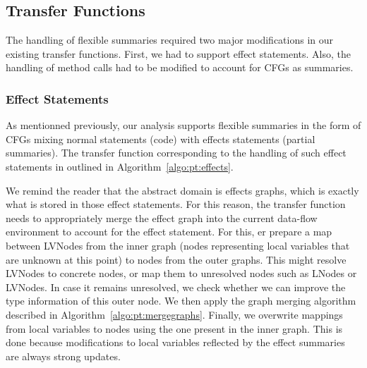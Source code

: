 \documentclass[a4paper]{article}
\begin{document}
\subsection{Transfer Functions}
The handling of flexible summaries required two major modifications in our
existing transfer functions. First, we had to support effect statements.
Also, the handling of method calls had to be modified to account for CFGs as
summaries.

\subsubsection{Effect Statements}
As mentionned previously, our analysis supports flexible summaries in the form
of CFGs mixing normal statements (code) with effects statements (partial
summaries). The transfer function corresponding to the handling of such effect
statements in outlined in Algorithm~\ref{algo:pt:effects}.

We remind the reader that the abstract domain is effects graphs, which is
exactly what is stored in those effect statements. For this reason, the
transfer function needs to appropriately merge the effect graph into the
current data-flow environment to account for the effect statement. For this,
er prepare a map between LVNodes from the inner graph (nodes representing local
variables that are unknown at this point) to nodes from the outer graphs. This
might resolve LVNodes to concrete nodes, or map them to unresolved nodes such
as LNodes or LVNodes. In case it remains unresolved, we check whether we can improve
the type information of this outer node. We then apply the graph merging
algorithm described in Algorithm~\ref{algo:pt:mergegraphs}. Finally, we
overwrite mappings from local variables to nodes using the one present in the
inner graph. This is done because modifications to local variables reflected by
the effect summaries are always strong updates.
\end{document}
